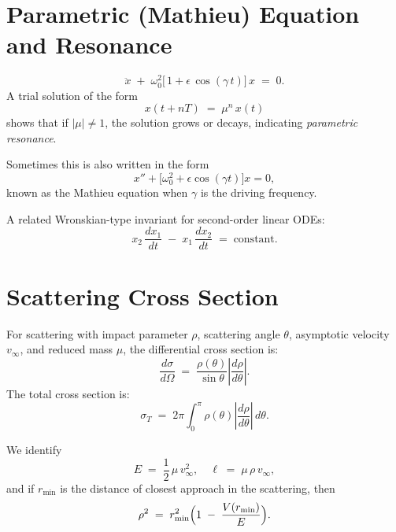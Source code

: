 \documentclass[12pt]{article}
\begin{document}
\section*{Parametric (Mathieu) Equation and Resonance}
\begin{equation*}
  \ddot{x} \;+\;\omega_{0}^{2}\bigl[\,1 + \epsilon\,\cos(\gamma\,t)\bigr]\,x \;=\; 0.
\end{equation*}
A trial solution of the form
\[
x(t + nT) \;=\; \mu^{n}\,x(t)
\]
shows that if $|\mu| \neq 1$, the solution grows or decays, indicating \emph{parametric resonance}.

Sometimes this is also written in the form
\[
x'' + \bigl[\omega_{0}^{2} + \epsilon \cos(\gamma t)\bigr]x = 0,
\]
known as the Mathieu equation when $\gamma$ is the driving frequency.

A related Wronskian-type invariant for second-order linear ODEs:
\[
x_{2}\,\frac{d x_{1}}{dt} \;-\; x_{1}\,\frac{d x_{2}}{dt} \;=\;\text{constant}.
\]

\section*{Scattering Cross Section}
For scattering with impact parameter $\rho$, scattering angle $\theta$, asymptotic velocity $v_\infty$, and reduced mass $\mu$, the differential cross section is:
\begin{equation*}
    \frac{d\sigma}{d\Omega}
    \;=\;
    \frac{\rho(\theta)}{\sin \theta}
    \left|\frac{d\rho}{d\theta}\right|.
\end{equation*}
The total cross section is:
\begin{equation*}
    \sigma_{T}
    \;=\;
    2\pi \int_{0}^{\pi}
    \rho(\theta)
    \left|\frac{d\rho}{d\theta}\right|
    \,d\theta.
\end{equation*}

We identify
\[
E \;=\;\frac12\,\mu\,v_{\infty}^{2},
\quad
\ell \;=\;\mu\,\rho\,v_{\infty},
\]
and if $r_{\min}$ is the distance of closest approach in the scattering, then
\[
\rho^{2}
\;=\;
r_{\min}^{2}\Bigl(1 \;-\;\frac{V(r_{\min})}{E}\Bigr).
\]

\end{document}
